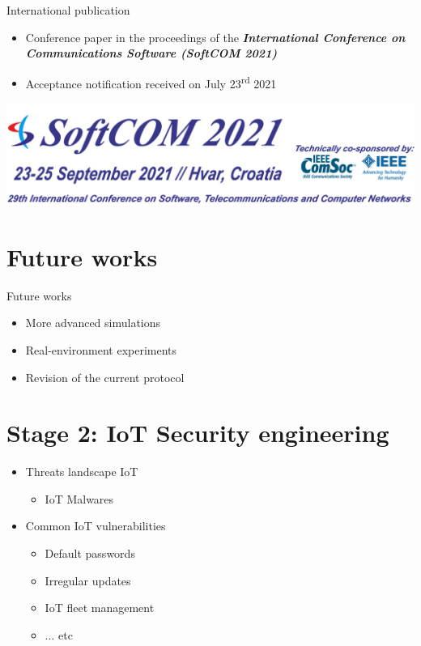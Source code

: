 \documentclass{beamer}
\begin{document}
\begin{frame}{International publication}
	\begin{itemize}
		\item Conference paper in the proceedings of the \emph{\textbf{International Conference on Communications Software (SoftCOM 2021)}}
		\item Acceptance notification received on July 23\textsuperscript{rd} 2021
	\end{itemize}
	\vfil
	\centering
	\includegraphics[scale=0.20]{figures/SoftCOM-Logo.png}
\end{frame}

\section{Future works}

\begin{frame}{Future works}
	\begin{itemize}
		\item More advanced simulations
		\pause
		\item Real-environment experiments
		\pause
		\item Revision of the current protocol
	\end{itemize}
\end{frame}

\section{Stage 2: IoT Security engineering}

\begin{frame}
	\begin{itemize}
		\item Threats landscape IoT
		\begin{itemize}
			\item IoT Malwares
		\end{itemize}
		\pause
		\vfil
		\item Common IoT vulnerabilities
		\begin{itemize}
			\item Default passwords
			\item Irregular updates
			\item IoT fleet management
			\item $\ldots$ etc
		\end{itemize}
	\end{itemize}
\end{frame}
\end{document}
